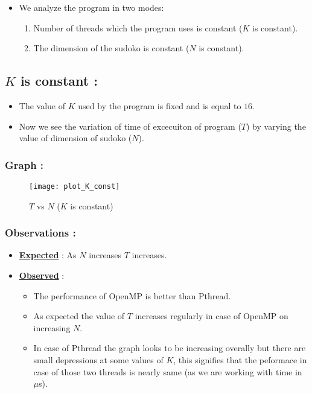 \documentclass[12pt,a4paper]{article}
\begin{document}
	\begin{itemize}
		\item We analyze the program in two modes:
		\begin{enumerate}
			\item Number of threads which the program uses is constant ($K$ is constant).
			\item The dimension of the sudoko is constant ($N$ is constant).
	\end{enumerate}
	\end{itemize}
	
	\subsection{$K$ is constant :}
	\begin{itemize}
		\item The value of $K$ used by the program is fixed and is equal to $16$.
		\item Now we see the variation of time of excecuiton of program ($T$) by varying the value of dimension of sudoko ($N$).
	\end{itemize}

	
	\subsubsection{Graph :}
	\begin{figure}[H]
		\centering
		\texttt{[image: plot\_K\_const]}
		\caption{$T$ vs $N$ ($K$ is constant)}
	\end{figure}
	\subsubsection{Observations :}
	\begin{itemize}
		\item \underline{\textbf{Expected}} : As $N$ increases $T$ increases.
		\item \underline{\textbf{Observed}} : 
		\begin{itemize}
			\item The performance of OpenMP is better than Pthread.
			\item As expected the value of $T$ increases regularly in case of OpenMP on increasing $N$.
			\item In case of Pthread the graph looks to be increasing overally but there are small depressions at some values of $K$, this signifies that the peformace in case of those two threads is nearly same (as we are working with time in $\mu$s).
		\end{itemize}
		
	\end{itemize}
	\pagebreak
\end{document}
